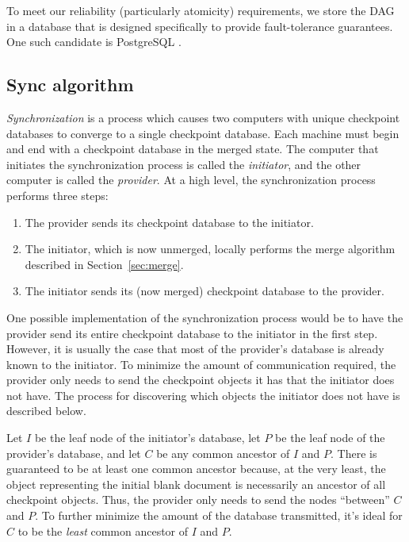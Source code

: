\documentclass[11pt,titlepage]{article}
\begin{document}
To meet our reliability (particularly atomicity) requirements, we
store the DAG in a database that is designed specifically to provide
fault-tolerance guarantees.  One such candidate is PostgreSQL
\cite{postgres}.

\subsection{Sync algorithm}

\emph{Synchronization} is a process which causes two computers with
unique checkpoint databases to converge to a single checkpoint
database.  Each machine must begin and end with a checkpoint database
in the merged state. The computer that initiates the synchronization
process is called the \emph{initiator}, and the other computer is
called the \emph{provider}. At a high level, the synchronization
process performs three steps:
\begin{enumerate}
\item The provider sends its checkpoint database to the initiator.
\item The initiator, which is now unmerged, locally performs the merge
  algorithm described in Section~\ref{sec:merge}.
\item The initiator sends its (now merged) checkpoint database to the
  provider.
\end{enumerate}
One possible implementation of the synchronization process would be to
have the provider send its entire checkpoint database to the initiator
in the first step. However, it is usually the case that most of the
provider's database is already known to the initiator. To minimize the
amount of communication required, the provider only needs to send the
checkpoint objects it has that the initiator does not have. The
process for discovering which objects the initiator does not have is
described below.

Let $I$ be the leaf node of the initiator's database, let $P$ be the
leaf node of the provider's database, and let $C$ be any common
ancestor of $I$ and $P$. There is guaranteed to be at least one common
ancestor because, at the very least, the object representing the
initial blank document is necessarily an ancestor of all checkpoint
objects. Thus, the provider only needs to send the nodes ``between''
$C$ and $P$. To further minimize the amount of the database
transmitted, it's ideal for $C$ to be the \emph{least} common ancestor
of $I$ and $P$.
\end{document}
